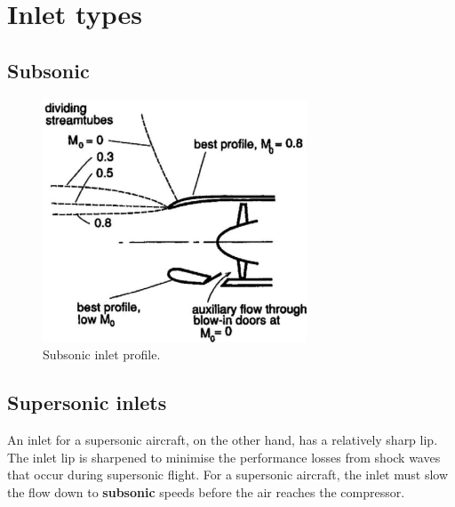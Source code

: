 \section{Inlet types}
\subsection{Subsonic}
\begin{figure}[H]
    \centering
    \includegraphics[width = 0.7\textwidth]{./img/diagram45.png}
    \caption{Subsonic inlet profile.}
\end{figure}
\subsection{Supersonic inlets}
An inlet for a supersonic aircraft, on the other hand, has a relatively sharp lip. The inlet lip is sharpened to minimise the performance losses from shock waves that occur during supersonic flight. For a supersonic aircraft, the inlet must slow the flow down to \textbf{subsonic} speeds before the air reaches the compressor.
